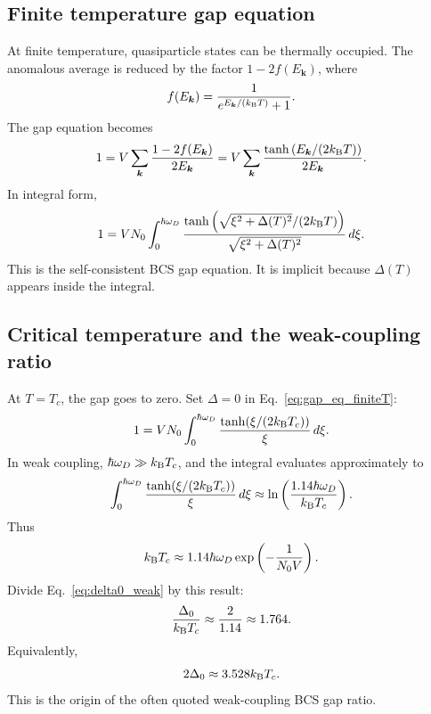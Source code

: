 \documentclass[11pt]{article}
\newcommand{\bk}{{\bm{k}}}
\begin{document}
\subsection{Finite temperature gap equation}
At finite temperature, quasiparticle states can be thermally occupied. The anomalous average is reduced by the factor $1-2f(E_\bk)$, where
\begin{equation}
 f(E_\bk)=\frac{1}{e^{E_\bk/(\kB T)}+1}.
\end{equation}
The gap equation becomes
\begin{equation}
1=V\sum_\bk\frac{1-2f(E_\bk)}{2E_\bk}
=V\sum_\bk\frac{\tanh\left(E_\bk/(2\kB T)\right)}{2E_\bk}.
\end{equation}
In integral form,
\begin{equation}
1=V N_0\int_0^{\hbar\omega_D}
\frac{\tanh\left(\sqrt{\xi^2+\Delta(T)^2}/(2k_{\mathrm{B}} T)\right)}
{\sqrt{\xi^2+\Delta(T)^2}}\,d\xi.
\label{eq:gap_eq_finiteT}
\end{equation}
This is the self-consistent BCS gap equation. It is implicit because $\Delta(T)$ appears inside the integral.

\subsection{Critical temperature and the weak-coupling ratio}
At $T=T_c$, the gap goes to zero. Set $\Delta=0$ in Eq.~\eqref{eq:gap_eq_finiteT}:
\begin{equation}
1=V N_0\int_0^{\hbar\omega_D}\frac{\tanh(\xi/(2k_{\mathrm{B}} T_c))}{\xi}\,d\xi.
\end{equation}
In weak coupling, $\hbar\omega_D\gg k_{\mathrm{B}} T_c$, and the integral evaluates approximately to
\begin{equation}
\int_0^{\hbar\omega_D}\frac{\tanh(\xi/(2k_{\mathrm{B}} T_c))}{\xi}\,d\xi
\approx \ln\left(\frac{1.14\hbar\omega_D}{k_{\mathrm{B}} T_c}\right).
\end{equation}
Thus
\begin{equation}
k_{\mathrm{B}} T_c\approx1.14\hbar\omega_D\exp\left(-\frac{1}{N_0V}\right).
\end{equation}
Divide Eq.~\eqref{eq:delta0_weak} by this result:
\begin{equation}
\frac{\Delta_0}{k_{\mathrm{B}} T_c}\approx\frac{2}{1.14}\approx1.764.
\end{equation}
Equivalently,
\begin{equation}
2\Delta_0\approx3.528k_{\mathrm{B}} T_c.
\end{equation}
This is the origin of the often quoted weak-coupling BCS gap ratio.
\end{document}
